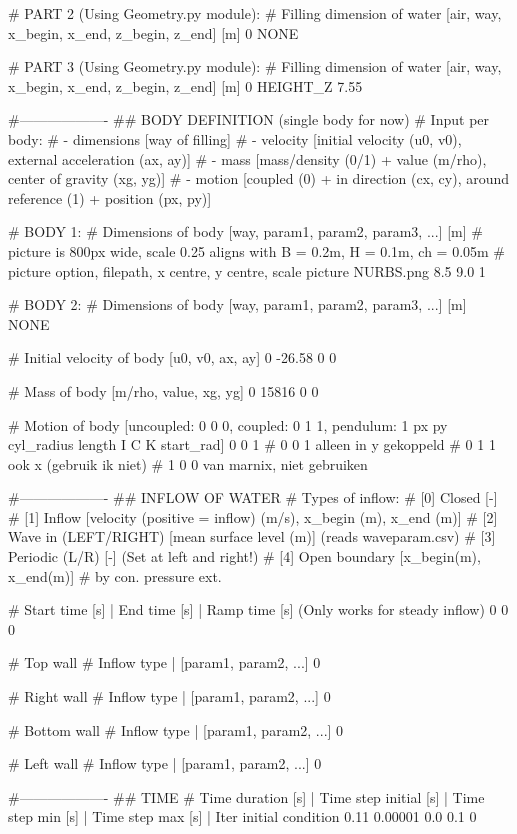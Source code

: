 # PART 2 (Using Geometry.py module):
# Filling dimension of water [air, way, x_begin, x_end, z_begin, z_end] [m]
0 NONE

# PART 3 (Using Geometry.py module):
# Filling dimension of water [air, way, x_begin, x_end, z_begin, z_end] [m]
0 HEIGHT_Z 7.55

#-------------------
## BODY DEFINITION (single body for now)
# Input per body:
# - dimensions      [way of filling]
# - velocity        [initial velocity (u0, v0), external acceleration (ax, ay)]
# - mass            [mass/density (0/1) + value (m/rho), center of gravity (xg, yg)]
# - motion          [coupled (0) + in direction (cx, cy), around reference (1) + position (px, py)]

# BODY 1:
# Dimensions of body [way, param1, param2, param3, ...] [m]
# picture is 800px wide, scale 0.25 aligns with B = 0.2m, H = 0.1m, ch = 0.05m
# picture option, filepath, x centre, y centre, scale
picture NURBS.png 8.5 9.0 1

# BODY 2:
# Dimensions of body [way, param1, param2, param3, ...] [m]
NONE

# Initial velocity of body [u0, v0, ax, ay]
0 -26.58 0 0

# Mass of body [m/rho, value, xg, yg]
0 15816 0 0

# Motion of body [uncoupled: 0 0 0, coupled: 0 1 1, pendulum: 1 px py cyl_radius length I C K start_rad]
0 0 1
# 0 0 1 alleen in y gekoppeld
# 0 1 1 ook x (gebruik ik niet)
# 1 0 0 van marnix, niet gebruiken

#-------------------
## INFLOW OF WATER
# Types of inflow:
# [0] Closed                [-]
# [1] Inflow                [velocity (positive = inflow) (m/s), x_begin (m), x_end (m)]
# [2] Wave in (LEFT/RIGHT)  [mean surface level (m)] (reads waveparam.csv)
# [3] Periodic (L/R)        [-] (Set at left and right!)
# [4] Open boundary         [x_begin(m), x_end(m)]
#     by con. pressure ext.

# Start time [s] | End time [s] | Ramp time [s] (Only works for steady inflow)
0 0 0

# Top wall
# Inflow type | [param1, param2, ...]
0

# Right wall
# Inflow type | [param1, param2, ...]
0

# Bottom wall
# Inflow type | [param1, param2, ...]
0

# Left wall
# Inflow type | [param1, param2, ...]
0

#-------------------
## TIME
# Time duration [s]	| Time step initial [s]		| Time step min [s]	| Time step max [s] | Iter initial condition
0.11 0.00001 0.0 0.1 0

